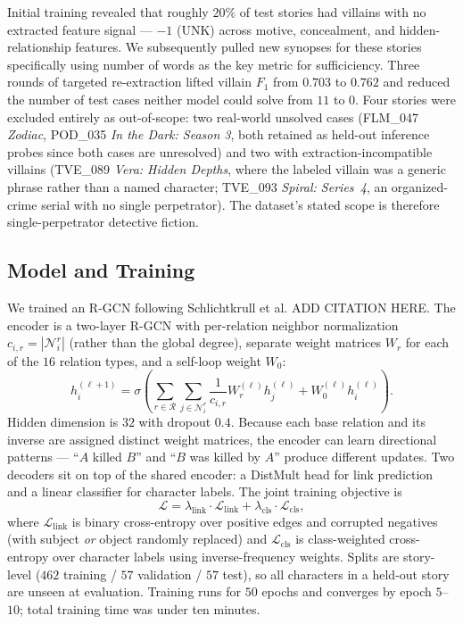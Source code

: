 \documentclass[11pt]{article}
\begin{document}
Initial training revealed that roughly $20\%$ of test stories had villains with no extracted feature signal --- $-1$ (UNK) across motive, concealment, and hidden-relationship features. We subsequently pulled new synopses for these stories specifically using number of words as the key metric for sufficiciency. Three rounds of targeted re-extraction lifted villain $F_1$ from $0.703$ to $0.762$ and reduced the number of test cases neither model could solve from $11$ to $0$. Four stories were excluded entirely as out-of-scope: two real-world unsolved cases (FLM\_047 \emph{Zodiac}, POD\_035 \emph{In the Dark: Season 3}, both retained as held-out inference probes since both cases are unresolved) and two with extraction-incompatible villains (TVE\_089 \emph{Vera: Hidden Depths}, where the labeled villain was a generic phrase rather than a named character; TVE\_093 \emph{Spiral: Series~4}, an organized-crime serial with no single perpetrator). The dataset's stated scope is therefore single-perpetrator detective fiction.

\subsection{Model and Training}
We trained an R-GCN following Schlichtkrull et al. \cite{}  ADD CITATION HERE. The encoder is a two-layer R-GCN with per-relation neighbor normalization $c_{i,r} = |\mathcal{N}_i^r|$ (rather than the global degree), separate weight matrices $W_r$ for each of the $16$ relation types, and a self-loop weight $W_0$:
\[
    h_i^{(\ell+1)}
    = \sigma\!\left(
        \sum_{r \in \mathcal{R}}
        \sum_{j \in \mathcal{N}_i^r}
        \frac{1}{c_{i,r}} W_r^{(\ell)} h_j^{(\ell)}
        + W_0^{(\ell)} h_i^{(\ell)}
      \right).
\]
Hidden dimension is $32$ with dropout $0.4$. Because each base relation and its inverse are assigned distinct weight matrices, the encoder can learn directional patterns --- ``$A$ killed $B$'' and ``$B$ was killed by $A$'' produce different updates. Two decoders sit on top of the shared encoder: a DistMult head for link prediction and a linear classifier for character labels. The joint training objective is
\[
    \mathcal{L}
    = \lambda_{\text{link}} \cdot \mathcal{L}_{\text{link}}
    + \lambda_{\text{cls}} \cdot \mathcal{L}_{\text{cls}},
\]
where $\mathcal{L}_{\text{link}}$ is binary cross-entropy over positive edges and corrupted negatives (with subject \emph{or} object randomly replaced) and $\mathcal{L}_{\text{cls}}$ is class-weighted cross-entropy over character labels using inverse-frequency weights. Splits are story-level ($462$ training / $57$ validation / $57$ test), so all characters in a held-out story are unseen at evaluation. Training runs for $50$ epochs and converges by epoch $5$--$10$; total training time was under ten minutes.
\end{document}

